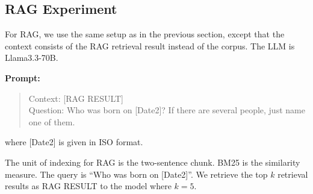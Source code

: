 \documentclass[11pt]{article}
\begin{document}





\subsection{RAG Experiment}

For RAG, we use the same setup as in the previous section,
except that the context consists of the RAG retrieval result
instead of the corpus. The LLM is Llama3.3-70B.

\textbf{Prompt:}
\begin{quote}
Context: [RAG RESULT]\\
Question:  Who was born on [Date2]? If there are several
people, just name one of them.
\end{quote}
where [Date2] is given in ISO format.


The unit of indexing for RAG is the
two-sentence chunk.
BM25 is the
similarity measure. The query is ``Who was born on
[Date2]''. We retrieve the top $k$ retrieval results as RAG
RESULT to the model where $k=5$.

\end{document}
